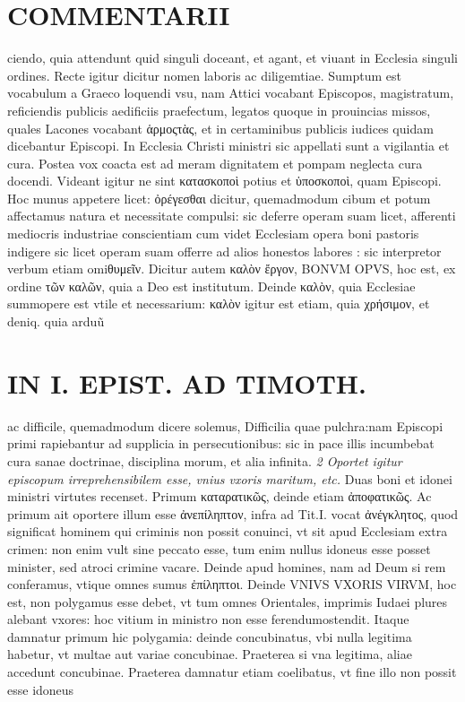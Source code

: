 \documentclass{article}
\begin{document}
\begin{pages}
\section*{COMMENTARII }
\marginpar{[ p.62 ]}\pstart ciendo, quia attendunt quid singuli doceant, et agant, et viuant in Ecclesia singuli ordines. Recte igitur dicitur nomen laboris ac diligemtiae. Sumptum est vocabulum a Graeco loquendi vsu, nam Attici vocabant Episcopos, magistratum, reficiendis publicis aedificiis praefectum, legatos quoque in prouincias missos, quales Lacones vocabant ἁρμοςτὰς, et in certaminibus publicis iudices quidam dicebantur Episcopi. In Ecclesia Christi ministri sic appellati sunt a vigilantia et cura. Postea vox coacta est ad meram dignitatem et pompam neglecta cura docendi. Videant igitur ne sint κατασκοποὶ potius et ὑποσκοποὶ, quam Episcopi.  \pend\pstart Hoc munus appetere licet: ὀρέγεσθαι dicitur, quemadmodum cibum et potum affectamus natura et necessitate compulsi: sic deferre operam suam licet, afferenti mediocris industriae conscientiam cum videt Ecclesiam opera boni pastoris indigere sic licet operam suam offerre ad alios honestos labores : sic interpretor verbum etiam omiθυμεῖν.  \pend\pstart Dicitur autem καλὸν ἔργον, BONVM OPVS, hoc est, ex ordine τῶν καλῶν, quia a Deo est institutum. Deinde καλὸν, quia Ecclesiae summopere est vtile et necessarium: καλὸν igitur est etiam, quia χρήσιμον, et deniq. quia arduũ  \pend
\section*{IN I. EPIST. AD TIMOTH. }
\marginpar{[ p.63 ]}\pstart ac difficile, quemadmodum dicere solemus, Difficilia quae pulchra:nam Episcopi primi rapiebantur ad supplicia in persecutionibus: sic in pace illis incumbebat cura sanae doctrinae, disciplina morum, et alia infinita.  \pend
\textit{2 Oportet igitur episcopum irreprehensibilem esse, vnius vxoris maritum, etc. }\pstart Duas boni et idonei ministri virtutes recenset. Primum καταρατικῶς, deinde etiam ἀποφατικῶς. Ac primum ait oportere illum esse ἀνεπίληπτον, infra ad Tit.I. vocat ἀνέγκλητος, quod significat hominem qui criminis non possit conuinci, vt sit apud Ecclesiam extra crimen: non enim vult sine peccato esse, tum enim nullus idoneus esse posset minister, sed atroci crimine vacare. Deinde apud homines, nam ad Deum si rem conferamus, vtique omnes sumus ἐπίληπτοι. Deinde VNIVS VXORIS VIRVM, hoc est, non polygamus esse debet, vt tum omnes Orientales, imprimis Iudaei plures alebant vxores: hoc vitium in ministro non esse ferendumostendit. Itaque damnatur primum hic polygamia: deinde concubinatus, vbi nulla legitima habetur, vt multae aut variae concubinae. Praeterea si vna legitima, aliae accedunt concubinae. Praeterea damnatur etiam coelibatus, vt fine illo non possit esse idoneus  \pend

\end{pages}
\end{document}
